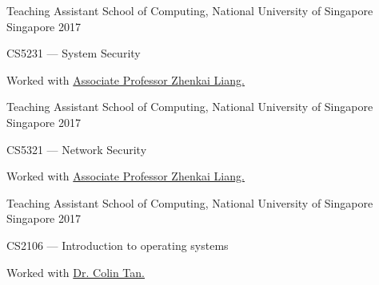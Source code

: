 


\begin{cventries}
  \cventry
    {Teaching Assistant} %
    {School of Computing, National University of Singapore} %
    {Singapore} %
    {2017} %
    {
      \begin{cvitems} %
        \item CS5231 --- System Security
        \item {Worked with \href{https://www.comp.nus.edu.sg/~liangzk/}{Associate Professor Zhenkai Liang.}}
      \end{cvitems}
    }


  \cventry
    {Teaching Assistant} %
    {School of Computing, National University of Singapore} %
    {Singapore} %
    {2017} %
    {
      \begin{cvitems} %
        \item CS5321 --- Network Security
        \item {Worked with \href{https://www.comp.nus.edu.sg/~liangzk/}{Associate Professor Zhenkai Liang.}}
      \end{cvitems}
    }

  \cventry
    {Teaching Assistant} %
    {School of Computing, National University of Singapore} %
    {Singapore} %
    {2017} %
    {
      \begin{cvitems} %
        \item CS2106 --- Introduction to operating systems 
        \item {Worked with \href{https://www.comp.nus.edu.sg/~ctank/}{Dr. Colin Tan.}}
      \end{cvitems}
    }


\end{cventries}
